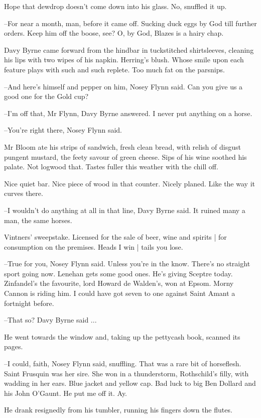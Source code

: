 Hope that dewdrop doesn't come down into his glass.
No,
snuffled it up.

--For near a month, man,
before it came off.
Sucking duck eggs by God till further orders.
Keep him off the boose, see?
O, by God,
Blazes is a hairy chap.

Davy Byrne came forward from the hindbar in tuckstitched shirtsleeves,
cleaning his lips with two wipes of his napkin.
Herring's blush.
Whose smile upon each feature plays with such and such replete.
Too much fat on the parsnips.

--And here's himself and pepper on him,
Nosey Flynn said.
Can you give us a good one for the Gold cup?

--I'm off that, Mr Flynn,
Davy Byrne answered.
I never put anything on a horse.

--You're right there,
Nosey Flynn said.

Mr Bloom ate his strips of sandwich,
fresh clean bread,
with relish of disgust pungent mustard,
the feety savour of green cheese.
Sips of his wine soothed his palate.
Not logwood that.
Tastes fuller this weather with the chill off.

Nice quiet bar.
Nice piece of wood in that counter.
Nicely planed.
Like the way it curves there.

--I wouldn't do anything at all in that line,
Davy Byrne said.
It ruined many a man,
the same horses.

Vintners' sweepstake.
Licensed for the sale of beer, wine and spirits |
for consumption on the premises.
Heads I win |
tails you lose.

--True for you,
Nosey Flynn said.
Unless you're in the know.
There's no straight sport going now.
Lenehan gets some good ones.
He's giving Sceptre today.
Zinfandel's the favourite,
lord Howard de Walden's,
won at Epsom.
Morny Cannon is riding him.
I could have got seven to one against Saint Amant a fortnight before.

--That so?
Davy Byrne said ...

He went towards the window and,
taking up the pettycash book,
scanned its pages.

--I could, faith,
Nosey Flynn said, snuffling.
That was a rare bit of horseflesh.
Saint Frusquin was her sire.
She won in a thunderstorm,
Rothschild's filly,
with wadding in her ears.
Blue jacket and yellow cap.
Bad luck to big Ben Dollard and his John O'Gaunt.
He put me off it.
Ay.

He drank resignedly from his tumbler,
running his fingers down the flutes.

